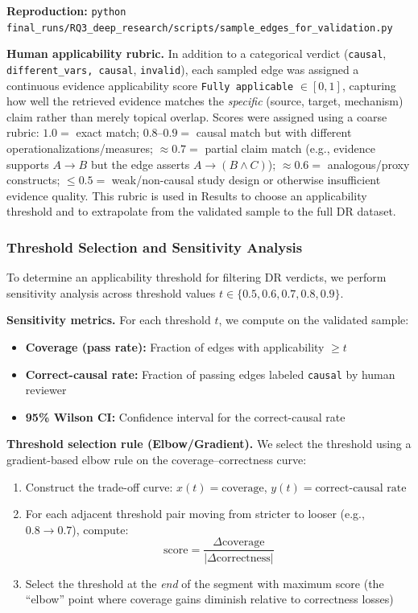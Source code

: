 \textbf{Reproduction:} \texttt{python final\_runs/RQ3\_deep\_research/scripts/sample\_edges\_for\_validation.py}

\vspace{0.25em}
\textbf{Human applicability rubric.} In addition to a categorical verdict (\texttt{causal}, \texttt{different\_vars, causal}, \texttt{invalid}), each sampled edge was assigned a continuous evidence applicability score \texttt{Fully applicable} \(\in[0,1]\), capturing how well the retrieved evidence matches the \textit{specific} (source, target, mechanism) claim rather than merely topical overlap. Scores were assigned using a coarse rubric: \(1.0=\) exact match; \(0.8\text{--}0.9=\) causal match but with different operationalizations/measures; \(\approx 0.7=\) partial claim match (e.g., evidence supports \(A\rightarrow B\) but the edge asserts \(A\rightarrow(B \wedge C)\)); \(\approx 0.6=\) analogous/proxy constructs; \(\le 0.5=\) weak/non-causal study design or otherwise insufficient evidence quality. This rubric is used in Results to choose an applicability threshold and to extrapolate from the validated sample to the full DR dataset.

\subsubsection{Threshold Selection and Sensitivity Analysis}
\label{sec:rq3_threshold_selection}

To determine an applicability threshold for filtering DR verdicts, we perform sensitivity analysis across threshold values $t \in \{0.5, 0.6, 0.7, 0.8, 0.9\}$.

\textbf{Sensitivity metrics.} For each threshold $t$, we compute on the validated sample:
\begin{itemize}[noitemsep]
    \item \textbf{Coverage (pass rate):} Fraction of edges with applicability $\geq t$
    \item \textbf{Correct-causal rate:} Fraction of passing edges labeled \texttt{causal} by human reviewer
    \item \textbf{95\% Wilson CI:} Confidence interval for the correct-causal rate
\end{itemize}

\textbf{Threshold selection rule (Elbow/Gradient).} We select the threshold using a gradient-based elbow rule on the coverage--correctness curve:
\begin{enumerate}[noitemsep]
    \item Construct the trade-off curve: $x(t) = \text{coverage}$, $y(t) = \text{correct-causal rate}$
    \item For each adjacent threshold pair moving from stricter to looser (e.g., $0.8 \rightarrow 0.7$), compute:
    \[
    \text{score} = \frac{\Delta \text{coverage}}{|\Delta \text{correctness}|}
    \]
    \item Select the threshold at the \textit{end} of the segment with maximum score (the ``elbow'' point where coverage gains diminish relative to correctness losses)
\end{enumerate}


